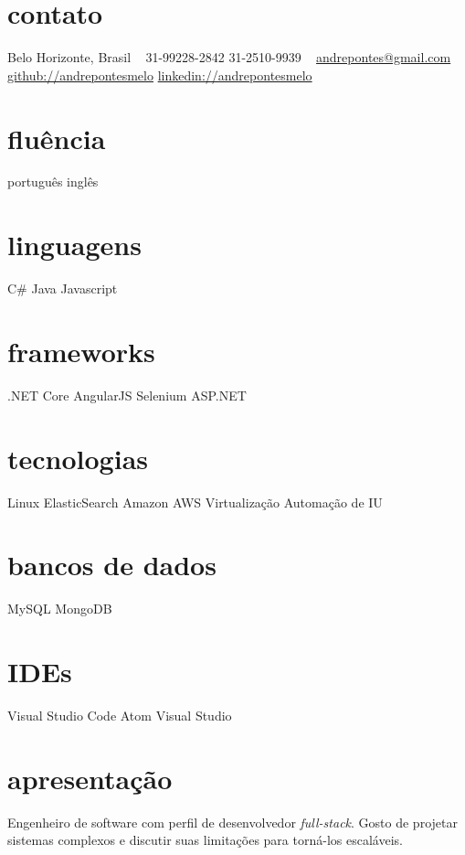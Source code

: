 \documentclass[]{friggeri-cv}
\begin{document}


\begin{aside}
\section{contato}
Belo Horizonte, Brasil
~
31-99228-2842
31-2510-9939
~
\href{mailto:andrepontes@gmail.com}{andrepontes@gmail.com}
\href{https://github.com/andrepontesmelo}{github://andrepontesmelo}
\href{https://br.linkedin.com/in/andrepontesmelo}{linkedin://andrepontesmelo}
\section{fluência}
português
inglês
\section{linguagens}
C\#
Java
Javascript
\section{frameworks}
.NET Core
AngularJS
Selenium
ASP.NET
\section{tecnologias}
Linux
ElasticSearch
Amazon AWS
Virtualização
Automação de IU
\section{bancos de dados}
MySQL
MongoDB
\section{IDEs}
Visual Studio Code
Atom
Visual Studio
\end{aside}

\section{apresentação}

Engenheiro de software com perfil de desenvolvedor \textit{full-stack}. Gosto de projetar sistemas complexos e discutir suas limitações para torná-los escaláveis.
\end{document}
